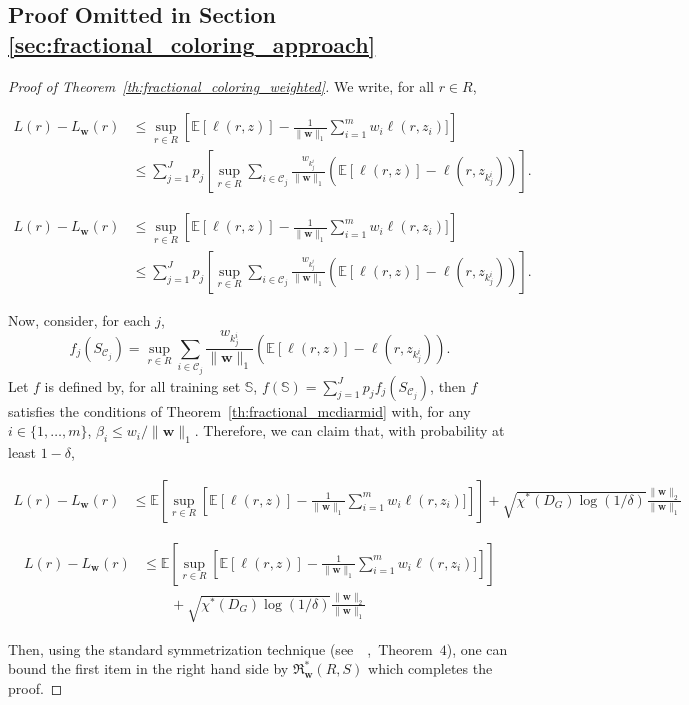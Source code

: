 \documentclass[letterpaper]{article} %
\def\DoubleColumn{}
\def\DoubleColumnEnd{}
\def\SingleColumn{}
\def\SingleColumnEnd{}
\newcommand{\E}{\mathbb{E}}
\newcommand{\weight}{\mathbf{w}}
\newcommand{\empiricalrisk}[1]{L_{#1}}
\newcommand{\risk}{L}
\newcommand{\normo}[1]{\|#1\|_1}
\newcommand{\fcoloring}{\chi^*}
\newcommand{\set}[1]{\{#1\}}
\newcommand{\trainingset}{\mathbb{S}}
\newcommand{\citep}[3]{(#1\ \citeauthor{#3}\ \citeyear{#3},\ #2)}
\begin{document}
\subsection{Proof Omitted in Section \ref{sec:fractional_coloring_approach}} %
\label{sub:proofs_omitted_in_section_a}
\begin{proof}[Proof of Theorem~\ref{th:fractional_coloring_weighted}]
We write, for all $r\in R$,
\SingleColumn
\begin{equation}
  \label{eq:fractional_coloring_decomposition}
    \begin{aligned}
    \risk{}(r)-\empiricalrisk{\weight{}}(r)&\le \sup_{r\in R}\left[\E[\ell(r,z)] - \frac{1}{\normo{\weight{}}}\sum_{i=1}^m w_i\ell(r,z_i)]\right]\\
    &\le \sum_{j=1}^J p_j\left[ \sup_{r\in R}\sum_{i\in\mathcal{C}_j} \frac{w_{k_j^i}}{\normo{\weight{}}} (\E[\ell(r,z)] - \ell(r,z_{k_j^i}))\right].
    \end{aligned}
\end{equation}
\SingleColumnEnd
\DoubleColumn
\begin{equation}
  \label{eq:fractional_coloring_decomposition}
    \begin{aligned}
    \risk{}(r)-\empiricalrisk{\weight{}}(r)&\le \sup_{r\in R}\left[\E[\ell(r,z)] - \frac{1}{\normo{\weight{}}}\sum_{i=1}^m w_i\ell(r,z_i)]\right]\\
    &\le \sum_{j=1}^J p_j\left[ \sup_{r\in R}\sum_{i\in\mathcal{C}_j} \frac{w_{k_j^i}}{\normo{\weight{}}} (\E[\ell(r,z)] - \ell(r,z_{k_j^i}))\right].
    \end{aligned}
\end{equation}
\DoubleColumnEnd
Now, consider, for each $j$,
\[f_j(S_{\mathcal{C}_j}) = \sup_{r\in R}\sum_{i\in\mathcal{C}_j} \frac{w_{k_j^i}}{\normo{\weight{}}} (\E[\ell(r,z)] - \ell(r,z_{k_j^i})).\]
Let $f$ is defined by, for all training set $\trainingset{}$, $f(\trainingset{})=\sum_{j=1}^Jp_jf_j(S_{\mathcal{C}_j})$, then $f$ satisfies the conditions of Theorem~\ref{th:fractional_mcdiarmid} with, for any $i\in \set{1,\dots,m}$, $\beta_i\le w_i/\normo{\weight{}}$. Therefore, we can claim that, with probability at least $1-\delta$,
\SingleColumn
\begin{align*}
  \risk{}(r) - \empiricalrisk{\weight{}}(r)&\le \E\left[\sup_{r\in R}\left[\E[\ell(r,z)] - \frac{1}{\normo{\weight{}}}\sum_{i=1}^m w_i\ell(r,z_i)]\right]\right] + \sqrt{\fcoloring(D_G)\log(1/\delta)}\frac{\|\weight{}\|_2}{\normo{\weight{}}}
\end{align*}
\SingleColumnEnd
\DoubleColumn
\begin{align*}
  \risk{}(r) - \empiricalrisk{\weight{}}(r)&\le \E\left[\sup_{r\in R}\left[\E[\ell(r,z)] - \frac{1}{\normo{\weight{}}}\sum_{i=1}^m w_i\ell(r,z_i)]\right]\right]\\
  &\qquad+ \sqrt{\fcoloring(D_G)\log(1/\delta)}\frac{\|\weight{}\|_2}{\normo{\weight{}}}
\end{align*}
\DoubleColumnEnd
Then, using the standard symmetrization technique \citep{see}{Theorem~$4$}{Usunier2005}, one can bound the first item in the right hand side by $\mathfrak{R}_{\weight{}}^*(R,S)$ which completes the proof. 
\end{proof}
\end{document}
